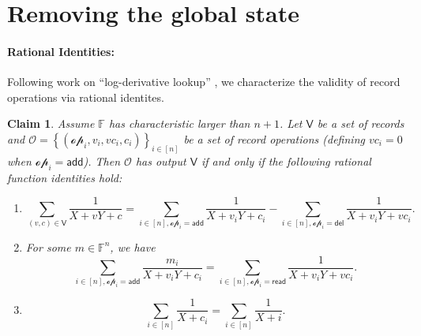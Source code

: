 \documentclass[11pt]{article} %
\newcommand{\F}{\ensuremath{\mathbb F}\xspace}
\newcommand{\sett}[2]{\ensuremath{\set{#1}_{#2}}\xspace}
\newcommand{\set}[1]{\ensuremath{\left\{#1\right\}}\xspace}
\newcommand{\sumi}[1]{\sum_{i\in[#1]}}
\newtheorem{claim}[lemma]{Claim}
\newcommand{\add}{\ensuremath{\mathsf{add}}\xspace}
\newcommand{\del}{\ensuremath{\mathsf{del}}\xspace}
\renewcommand{\read}{\ensuremath{\mathsf{read}}\xspace}
\newcommand{\ops}{\ensuremath{\mathcal{O}}\xspace}
\newcommand{\op}{\ensuremath{\mathscr{op}}\xspace}
\newcommand{\recset}{\ensuremath{\mathsf{V}}\xspace}
\begin{document}
\section{Removing the global state}\label{sec:Fstar}

\paragraph{Rational Identities:}
Following work on ``log-derivative lookup'' \cite{bplusplus,logup}, we characterize the validity of record operations via rational identites.
\begin{claim}\label{clm:reducetologder}
Assume $\F$ has characteristic larger than $n+1$.
Let \recset be a set of records and $\ops=\sett{(\op_i,v_i,vc_i,c_i)}{i\in [n]}$ be a set of record operations (defining $vc_i=0$ when $\op_i=\add$).
Then \ops has output \recset if and only if the following rational function identities hold:
\begin{enumerate}
 \item \[\sum_{(v,c)\in \recset}\frac{1}{X+vY+c}=\sum_{i\in [n],\op_i=\add}\frac{1}{X+v_iY+c_i}-\sum_{i\in [n], \op_i=\del}\frac{1}{X+v_iY+vc_i}.\]
 \item For some $m\in \F^n$,
 we have
 \[\sum_{i\in [n],\op_i=\add}\frac{m_i}{X+v_iY+c_i}=\sum_{i\in [n], \op_i=\read}\frac{1}{X+v_iY+vc_i}.\]
 \item \[\sumi{n}\frac{1}{X+c_i}=\sumi{n}\frac{1}{X+i}.\]
\end{enumerate}
\end{claim}
\end{document}
